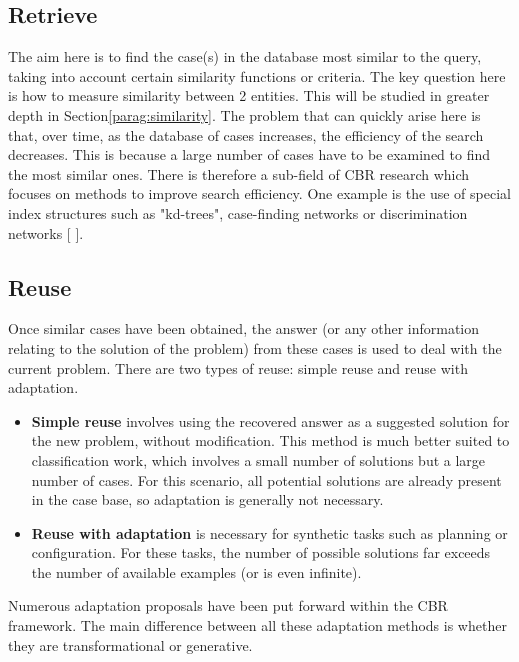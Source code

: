     \subsection{Retrieve}
    The aim here is to find the case(s) in the database most similar to the query, taking into account certain similarity functions or criteria. The key question here is how to measure similarity between 2 entities. This will be studied in greater depth in Section\ref{parag:similarity}. The problem that can quickly arise here is that, over time, as the database of cases increases, the efficiency of the search decreases. This is because a large number of cases have to be examined to find the most similar ones. There is therefore a sub-field of CBR research which focuses on methods to improve search efficiency. One example is the use of special index structures such as "kd-trees", case-finding networks or discrimination networks [ ].
    
    \subsection{Reuse}
    Once similar cases have been obtained, the answer (or any other information relating to the solution of the problem) from these cases is used to deal with the current problem. There are two types of reuse: simple reuse and reuse with adaptation. 
    
    \begin{itemize}
        \item \textbf{Simple reuse} involves using the recovered answer as a suggested solution for the new problem, without modification. This method is much better suited to classification work, which involves a small number of solutions but a large number of cases.  For this scenario, all potential solutions are already present in the case base, so adaptation is generally not necessary. 
        
        \item \textbf{Reuse with adaptation} is necessary for synthetic tasks such as planning or configuration. For these tasks, the number of possible solutions far exceeds the number of available examples (or is even infinite).
    \end{itemize}

    Numerous adaptation proposals have been put forward within the CBR framework. The main difference between all these adaptation methods is whether they are transformational or generative.
    

